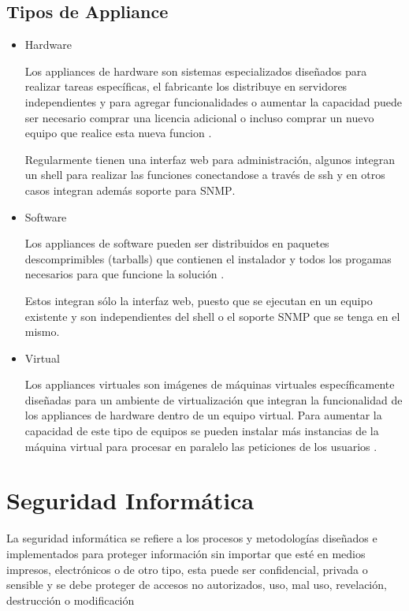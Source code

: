     \subsection{Tipos de Appliance}

\begin{itemize}

  \item Hardware

Los appliances de hardware son sistemas especializados dise\~{n}ados para realizar tareas espec\'{i}ficas, el fabricante los distribuye en servidores independientes y para agregar funcionalidades o aumentar la capacidad puede ser necesario comprar una licencia adicional o incluso comprar un nuevo equipo que realice esta nueva funcion \cite{}.

Regularmente tienen una interfaz web para administraci\'{o}n, algunos integran un shell para realizar las funciones conectandose a trav\'{e}s de ssh y en otros casos integran adem\'{a}s soporte para \textsc{SNMP}.

  \item Software

Los appliances de software pueden ser distribuidos en paquetes descomprimibles (tarballs) que contienen el instalador y todos los progamas necesarios para que funcione la soluci\'{o}n \cite{_bitnami:_????}.

Estos integran s\'{o}lo la interfaz web, puesto que se ejecutan en un equipo existente y son independientes del shell o el soporte \textsc{SNMP} que se tenga en el mismo.

  \item Virtual

Los appliances virtuales son im\'{a}genes de m\'{a}quinas virtuales espec\'{i}ficamente dise\~{n}adas para un ambiente de virtualizaci\'{o}n que integran la funcionalidad de los appliances de hardware dentro de un equipo virtual. Para aumentar la capacidad de este tipo de equipos se pueden instalar m\'{a}s instancias de la m\'{a}quina virtual para procesar en paralelo las peticiones de los usuarios \cite{_why_????}.

\end{itemize}

\section {Seguridad Inform\'{a}tica}

La seguridad inform\'{a}tica se refiere a los procesos y metodolog\'{i}as dise\~{n}ados e implementados para proteger informaci\'{o}n sin importar que est\'{e} en medios impresos, electr\'{o}nicos o de otro tipo, esta puede ser confidencial, privada o sensible y se debe proteger de accesos no autorizados, uso, mal uso, revelaci\'{o}n, destrucci\'{o}n o modificaci\'{o}n \cite{_sans:_????}

